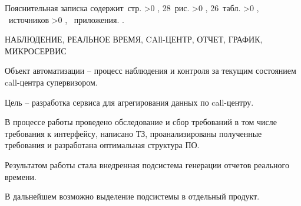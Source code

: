 \Referat

\thispagestyle{empty}

Пояснительная записка содержит \pageref{LastPage}\,стр.%
\ifnum \totfig >0
, 28~рис.%
\fi
\ifnum \tottab >0
, 26~табл.%
\fi
%
\ifnum \totbib >0
, \totbib~источников%
\fi
%
\ifnum \totapp >0
, \totapp~приложения.%
\else
.%
\fi

НАБЛЮДЕНИЕ, РЕАЛЬНОЕ ВРЕМЯ, CAll-ЦЕНТР, ОТЧЕТ, ГРАФИК, МИКРОСЕРВИС

Объект автоматизации -- процесс наблюдения и контроля за текущим состоянием call-центра супервизором.

Цель -- разработка сервиса для агрегирования данных по call-центру.

В процессе работы проведено обследование и сбор требований в том числе требования к интерфейсу,
написано ТЗ, проанализированы полученные требования и разработана оптимальная структура ПО.

Результатом работы стала внедренная подсистема генерации отчетов реального времени.

В дальнейшем возможно выделение подсистемы в отдельный продукт.